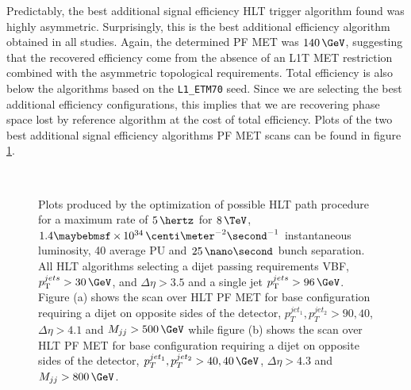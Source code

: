 Predictably, the best additional signal efficiency \gls{HLT} trigger algorithm found was highly asymmetric. Surprisingly, this is the best additional efficiency algorithm obtained in all studies. Again, the determined \gls{PF} \gls{MET} was $140\,\GeV$, suggesting that the recovered efficiency come from the absence of an \gls{L1T} \gls{MET} restriction combined with the asymmetric topological requirements. Total efficiency is also below the algorithms based on the \verb|L1_ETM70| seed. Since we are selecting the best additional efficiency configurations, this implies that we are recovering phase space lost by reference algorithm at the cost of total efficiency. Plots of the two best additional signal efficiency algorithms \gls{PF} \gls{MET} scans can be found in figure \ref{FIGURE:RunIITriggerStudies_HLT_Seed_L1TDijetSingleJet}.

\begin{figure}[!htp]%
\centering
{}\qquad
{}\\
\caption{Plots produced by the optimization of possible \gls{HLT} path procedure for a maximum rate of $5\,\hertz$ for $8\,\TeV$, $1.4 \times 10^{34}\,\centi\meter^{-2}\second^{-1}$ instantaneous luminosity, 40 average \gls{PU} and $25\,\nano\second$ bunch separation. All \gls{HLT} algorithms selecting a dijet passing requirements \gls{VBF}, $\pt^{jets}>30\,\GeV$, and $\Delta\eta>3.5$ and a single jet $\pt^{jets}>96\,\GeV$. Figure (a) shows the scan over \gls{HLT} \gls{PF} \gls{MET} for base configuration requiring a dijet on opposite sides of the detector, $p_T^{jet_1},p_T^{jet_2}>90,40$, $\Delta\eta>4.1$ and $M_{jj}>500\,\GeV$ while figure (b) shows the scan over \gls{HLT} \gls{PF} \gls{MET} for base configuration requiring a dijet on opposite sides of the detector, $p_T^{jet_1},p_T^{jet_2}>40,40\,\GeV$, $\Delta\eta>4.3$ and $M_{jj}>800\,\GeV$.}
\label{FIGURE:RunIITriggerStudies_HLT_Seed_L1TDijetSingleJet}
\end{figure}

